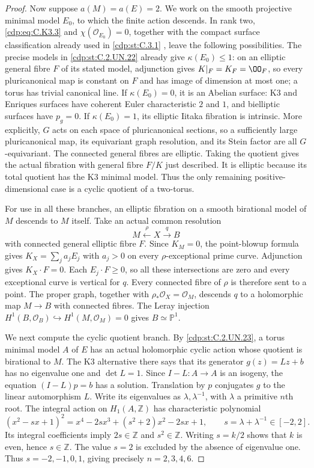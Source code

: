 \begin{proof}
Now suppose $a(M)=a(E)=2$. We work on the smooth
projective minimal model $E_0$, to which the finite
action descends. In rank two, \eqref{cdp:eq:C.K3.3} and
$\chi(\mathcal O_{E_0})=0$, together with the compact
surface classification already used in \ref{cdp:st:C.3.1}
\cite[Theorem~3.1]{Peters1990}, leave the following
possibilities. The precise models in \ref{cdp:st:C.2.UN.22}
already give $\kappa(E_0)\le1$: on an elliptic general fibre
$F$ of its stated model, adjunction gives
$K|_F=K_F=\OO_F$, so every pluricanonical map is constant
on $F$ and has image of dimension at most one; a torus
has trivial canonical line. If $\kappa(E_0)=0$, it is an Abelian
surface: K3 and Enriques surfaces have coherent Euler
characteristic $2$ and $1$, and bielliptic surfaces have
$p_g=0$. If $\kappa(E_0)=1$, its elliptic Iitaka
fibration is intrinsic. More explicitly, $G$ acts on
each space of pluricanonical sections, so a sufficiently
large pluricanonical map, its equivariant graph resolution,
and its Stein factor are all $G$-equivariant. The
connected general fibres are elliptic. Taking the
quotient gives the actual fibration with general fibre
$F/K$ just described. It is elliptic because its total
quotient has the K3 minimal model. Thus the only
remaining positive-dimensional case is a cyclic quotient
of a two-torus.

For use in all these branches, an elliptic fibration on
a smooth birational model of $M$ descends to $M$ itself.
Take an actual common resolution
\[
                  M\xleftarrow{\rho}X\xrightarrow{q}B
                                                               \tag{C.K3.5}\label{cdp:eq:C.K3.5}
\]
with connected general elliptic fibre $F$. Since $K_M=0$,
the point-blowup formula gives
$K_X=\sum_j a_jE_j$ with $a_j>0$ on every
$\rho$-exceptional prime curve. Adjunction gives
$K_X\cdot F=0$. Each $E_j\cdot F\ge0$, so all these
intersections are zero and every exceptional curve is
vertical for $q$. Every connected fibre of $\rho$ is
therefore sent to a point. The proper graph, together
with $\rho_*\mathcal O_X=\mathcal O_M$, descends $q$
to a holomorphic map $M\to B$ with connected fibres.
The Leray injection
$H^1(B,\mathcal O_B)\hookrightarrow H^1(M,\mathcal O_M)=0$
gives $B\simeq\mathbb P^1$.

We next compute the cyclic quotient branch. By
\ref{cdp:st:C.2.UN.23}, a torus minimal model $A$ of $E$ has an
actual holomorphic cyclic action whose quotient is
birational to $M$. The K3 alternative there says that
its generator $g(z)=Lz+b$ has no eigenvalue one and
$\det L=1$. Since $I-L:A\to A$ is an isogeny, the
equation $(I-L)p=b$ has a solution. Translation by
$p$ conjugates $g$ to the linear automorphism $L$.
Write its eigenvalues as $\lambda,\lambda^{-1}$,
with $\lambda$ a primitive $n$th root. The integral
action on $H_1(A,\mathbb Z)$ has characteristic polynomial
\[
 (x^2-sx+1)^2
   =x^4-2sx^3+(s^2+2)x^2-2sx+1,
 \qquad s=\lambda+\lambda^{-1}\in[-2,2].
                                                               \tag{C.K3.6}\label{cdp:eq:C.K3.6}
\]
Its integral coefficients imply $2s\in\mathbb Z$
and $s^2\in\mathbb Z$. Writing $s=k/2$ shows that
$k$ is even, hence $s\in\mathbb Z$. The value $s=2$
is excluded by the absence of eigenvalue one.
Thus $s=-2,-1,0,1$, giving precisely
$n=2,3,4,6$.


\end{proof}
